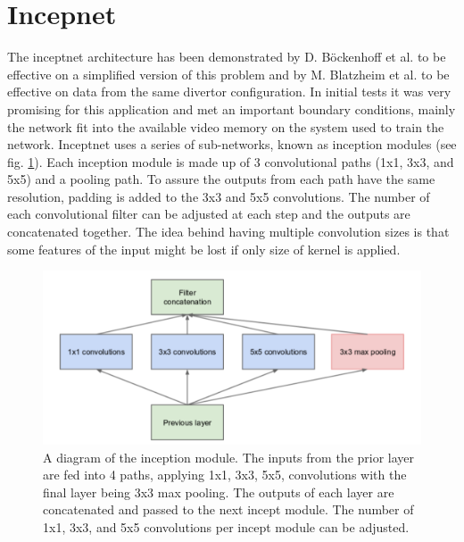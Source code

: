 \label{sec:code:inceptnet}
\section{Incepnet}

The inceptnet architecture \cite{https://doi.org/10.48550/arxiv.1409.4842} has been demonstrated by D. Böckenhoff et al. \cite{Böckenhoff_2019} to be effective on a simplified version of this problem and by M. Blatzheim et al. \cite{Blatzheim_2019} to be effective on data from the same divertor configuration. In initial tests it was very promising for this application and met an important boundary conditions, mainly the network fit into the available video memory on the system used to train the network. Inceptnet uses a series of sub-networks, known as inception modules (see fig. \ref{fig:code:inceptmodule}). Each inception module is made up of 3 convolutional paths (1x1, 3x3, and 5x5) and a pooling path. To assure the outputs from each path have the same resolution, padding is added to the 3x3 and 5x5 convolutions. The number of each convolutional filter can be adjusted at each step and the outputs are concatenated together. The idea behind having multiple convolution sizes is that some features of the input might be lost if only size of kernel is applied.

\begin{figure}[htb]
    \includegraphics[width=\textwidth]{images/incept-simple.png}
    \caption{A diagram of the inception module. The inputs from the prior layer are fed into 4 paths, applying 1x1, 3x3, 5x5, convolutions with the final layer being 3x3 max pooling. The outputs of each layer are concatenated and passed to the next incept module. The number of 1x1, 3x3, and 5x5 convolutions per incept module can be adjusted.}
    \label{fig:code:inceptmodule}
\end{figure}

